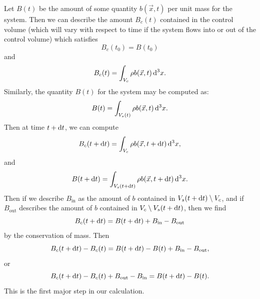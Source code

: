\begin{node}
Let $B(t)$ be the amount of some quantity $b(\vec{x},t)$ per unit
mass for the system. Then we can describe the amount $B_{c}(t)$ contained in the
control volume (which will vary with respect to time if the system
flows into or out of the control volume) which satisfies
\begin{equation}
B_{c}(t_{0})=B(t_{0})
\end{equation}
and
\begin{equation}
B_{c}(t)=\int_{V_{c}}\rho b(\vec{x},t)\,\mathrm{d}^{3}x.
\end{equation}
Similarly, the quantity $B(t)$ for the system may be computed as:
\begin{equation}
B(t)=\int_{V_{s}(t)}\rho b(\vec{x},t)\,\mathrm{d}^{3}x.
\end{equation}
Then at time $t+\mathrm{d} t$, we can compute
\begin{equation}
B_{c}(t+\mathrm{d} t)=\int_{V_{c}}\rho b(\vec{x},t+\mathrm{d} t)\,\mathrm{d}^{3}x,
\end{equation}
and
\begin{equation}
B(t+\mathrm{d} t)=\int_{V_{s}(t+\mathrm{d} t)}\rho b(\vec{x},t + \mathrm{d} t)\,\mathrm{d}^{3}x.
\end{equation}
Then if we describe $B_{\text{in}}$ as the amount of $b$ contained in
$V_{s}(t+\mathrm{d} t)\setminus V_{c}$, and if $B_{\text{out}}$ describes the
amount of $b$ contained in $V_{c}\setminus V_{s}(t+\mathrm{d} t)$, then we
find
\begin{equation}
B_{c}(t+\mathrm{d} t)=B(t+\mathrm{d} t)+B_{\text{in}}-B_{\text{out}}
\end{equation}
by the conservation of mass. Then
\begin{equation}
B_{c}(t+\mathrm{d} t)-B_{c}(t)=B(t+\mathrm{d} t)-B(t)+B_{\text{in}}-B_{\text{out}},
\end{equation}
or
\begin{equation}\label{eq:fall:lec03:first-major-step}
B_{c}(t+\mathrm{d} t)-B_{c}(t)+B_{\text{out}}-B_{\text{in}}=B(t+\mathrm{d} t)-B(t).
\end{equation}
This is the first major step in our calculation.
\end{node}

